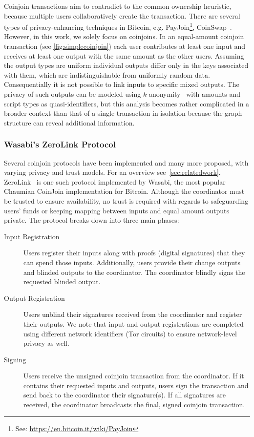 \documentclass[a4paper]{article}
\begin{document}
Coinjoin transactions aim to contradict to the common ownership heuristic, because multiple users collaboratively create the transaction. There are several types of privacy-enhancing techniques in Bitcoin, e.g. PayJoin\footnote{See: \url{https://en.bitcoin.it/wiki/PayJoin}}, CoinSwap~\cite{belcher2020design}. However, in this work, we solely focus on coinjoins. In an equal-amount coinjoin transaction (see \cref{fig:simplecoinjoin}) each user contributes at least one input and receives at least one output with the same amount as the other users. Assuming the output types are uniform individual outputs differ only in the keys associated with them, which are indistinguishable from uniformly random data. Consequentially it is not possible to link inputs to specific mixed outputs. The privacy of such outputs can be modeled using $k$-anonymity~\cite{sweeney2002k} with amounts and script types as quasi-identifiers, but this analysis becomes rather complicated in a broader context than that of a single transaction in isolation because the graph structure can reveal additional information.

\subsubsection{Wasabi's ZeroLink Protocol}

Several coinjoin protocols have been implemented and many more proposed, with varying privacy and trust models. For an overview see~\cref{sec:relatedwork}. ZeroLink~\cite{zerolink} is one such protocol implemented by Wasabi, the most popular Chaumian CoinJoin implementation for Bitcoin. Although the coordinator must be trusted to ensure availability, no trust is required with regards to safeguarding users' funds or keeping mapping between inputs and equal amount outputs private. The protocol breaks down into three main phases:

\begin{description}
 \item[Input Registration] Users register their inputs along with proofs (digital signatures) that they can spend those inputs. Additionally, users provide their change outputs and blinded outputs to the coordinator. The coordinator blindly signs the requested blinded output.
 \item[Output Registration] Users unblind their signatures received from the coordinator and register their outputs. We note that input and output registrations are completed using different network identifiers (Tor circuits) to ensure network-level privacy as well.
 \item[Signing] Users receive the unsigned coinjoin transaction from the coordinator. If it contains their requested inputs and outputs, users sign the transaction and send back to the coordinator their signature(s). If all signatures are received, the coordinator broadcasts the final, signed coinjoin transaction.
\end{description}
\end{document}
